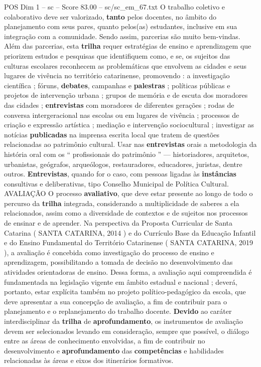 \begin{textsample}{POS Dim 1 – sc – Score 83.00 – sc/sc\_em\_67.txt}
O trabalho coletivo e colaborativo deve ser valorizado, \textbf{tanto} pelos docentes, no âmbito do planejamento com seus pares, quanto pelos(as) estudantes, inclusive em sua integração com a comunidade.
Sendo assim, parcerias são muito bem-vindas.
Além das parcerias, esta \textbf{trilha} requer estratégias de ensino e aprendizagem que priorizem estudos e pesquisas que identifiquem como, e se, os sujeitos das culturas escolares reconhecem as problemáticas que envolvem as cidades e seus lugares de vivência no território catarinense, promovendo : a investigação científica ; fóruns, \textbf{debates}, campanhas e \textbf{palestras} ; políticas públicas e projetos de intervenção urbana ; grupos de memória e de escuta dos moradores das cidades ; \textbf{entrevistas} com moradores de diferentes gerações ; rodas de conversa intergeracional nas escolas ou em lugares de vivência ; processos de criação e expressão artística ; mediação e intervenção sociocultural ; investigar as notícias \textbf{publicadas} na imprensa escrita local que tratem de questões relacionadas ao patrimônio cultural.
Usar nas \textbf{entrevistas} orais a metodologia da história oral com os “ profissionais do patrimônio ” — historiadores, arquitetos, urbanistas, geógrafos, arqueólogos, restauradores, educadores, juristas, dentre outros. \textbf{Entrevistas}, quando for o caso, com pessoas ligadas às \textbf{instâncias} consultivas e deliberativas, tipo Conselho Municipal de Política Cultural.
AVALIAÇÃO O processo \textbf{avaliativo}, que deve estar presente ao longo de todo o percurso da \textbf{trilha} integrada, considerando a multiplicidade de saberes a ela relacionados, assim como a diversidade de contextos e de sujeitos nos processos de ensinar e de aprender.
Na perspectiva da Proposta Curricular de Santa Catarina ( SANTA CATARINA, 2014 ) e do Currículo Base da Educação Infantil e do Ensino Fundamental do Território Catarinense ( SANTA CATARINA, 2019 ), a avaliação é concebida como investigação do processo de ensino e aprendizagem, possibilitando a tomada de decisão no desenvolvimento das atividades orientadoras de ensino.
Dessa forma, a avaliação aqui compreendida é fundamentada na legislação vigente em âmbito estadual e nacional ; deverá, portanto, estar explícita também no projeto político-pedagógico da escola, que deve apresentar a sua concepção de avaliação, a fim de contribuir para o planejamento e o replanejamento do trabalho docente. \textbf{Devido} ao caráter interdisciplinar da \textbf{trilha} de \textbf{aprofundamento}, os instrumentos de avaliação devem ser selecionados levando em consideração, sempre que possível, o diálogo entre as áreas de conhecimento envolvidas, a fim de contribuir no desenvolvimento e \textbf{aprofundamento} das \textbf{competências} e habilidades relacionadas às áreas e eixos dos itinerários formativos.

\end{textsample}
